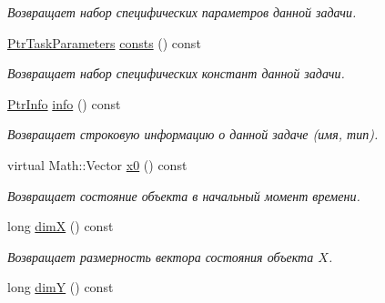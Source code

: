 \begin{DoxyCompactItemize}
\begin{DoxyCompactList}\small\item\em Возвращает набор специфических параметров данной задачи. \end{DoxyCompactList}\item 
\hyperlink{namespace_core_a3e0e555656bf795146ebb0882e28da2f}{Ptr\+Task\+Parameters} \hyperlink{class_core_1_1_task_ae9d1b95f45779f5c4f1d96c3bf35a495}{consts} () const \hypertarget{class_core_1_1_task_ae9d1b95f45779f5c4f1d96c3bf35a495}{}\label{class_core_1_1_task_ae9d1b95f45779f5c4f1d96c3bf35a495}

\begin{DoxyCompactList}\small\item\em Возвращает набор специфических констант данной задачи. \end{DoxyCompactList}\item 
\hyperlink{namespace_core_a647483da8a1266d5bbd3e9bb5cd66d08}{Ptr\+Info} \hyperlink{class_core_1_1_task_a2e59361a62c38b940ad25a297b0f353d}{info} () const \hypertarget{class_core_1_1_task_a2e59361a62c38b940ad25a297b0f353d}{}\label{class_core_1_1_task_a2e59361a62c38b940ad25a297b0f353d}

\begin{DoxyCompactList}\small\item\em Возвращает строковую информацию о данной задаче (имя, тип). \end{DoxyCompactList}\item 
virtual Math\+::\+Vector \hyperlink{class_core_1_1_task_a953cf6c745534e85cb0e36b8294c48ff}{x0} () const 
\begin{DoxyCompactList}\small\item\em Возвращает состояние объекта в начальный момент времени. \end{DoxyCompactList}\item 
long \hyperlink{class_core_1_1_task_ad3679ffe75d4149a223d378071587281}{dimX} () const \hypertarget{class_core_1_1_task_ad3679ffe75d4149a223d378071587281}{}\label{class_core_1_1_task_ad3679ffe75d4149a223d378071587281}

\begin{DoxyCompactList}\small\item\em Возвращает размерность вектора состояния объекта $X$. \end{DoxyCompactList}\item 
long \hyperlink{class_core_1_1_task_afb53a5d106a715f521d3bf0815835c76}{dimY} () const \hypertarget{class_core_1_1_task_afb53a5d106a715f521d3bf0815835c76}{}\label{class_core_1_1_task_afb53a5d106a715f521d3bf0815835c76}


\end{DoxyCompactItemize}
